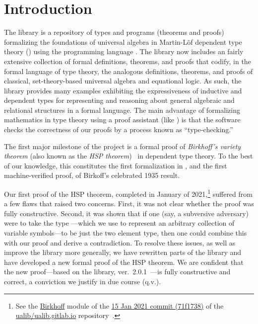 \section{Introduction}
The \agdaalgebras library \cite{ualib_v2.0.1} is a repository of types and programs
(theorems and proofs) formalizing the foundations of universal algebra in Martin-Löf
dependent type theory (\mltt) using the \agda programming language \cite{Norell:2007,agdaref}.
The library now includes an fairly extensive collection of formal definitions, theorems, and
proofs that codify, in the formal language of type theory, the analogous definitions,
theorems, and proofs of classical, set-theory-based universal algebra and equational
logic. As such, the \agdaalgebras library provides many examples exhibiting the
expressiveness of inductive and dependent types for representing and reasoning about
general algebraic and relational structures in a formal language.
\ifshort\else
The main advantage of
formalizing mathematics in type theory using a proof assistant (like \agda) is that
the software checks the correctness of our proofs by a process known as ``type-checking.''
\fi

The first major milestone of the \agdaalgebras project is a formal proof of \emph{Birkhoff's
variety theorem} (also known as the \emph{HSP theorem})~\cite{Birkhoff:1935} in dependent
type theory.
To the best of our knowledge, this constitutes the first formalization in \mltt, and the
first machine-verified proof, of Birkoff's celebrated 1935 result.

Our first proof of the HSP theorem, completed in January of
2021,\footnote{See the
 \href{https://github.com/ualib/ualib.github.io/blob/71f173858701398d56224dd79d152c380c0c2b5e/src/lagda/UALib/Birkhoff.lagda}{Birkhoff}
 module of the
 \href{https://github.com/ualib/ualib.github.io/commit/71f173858701398d56224dd79d152c380c0c2b5e}{15
 Jan 2021  commit (71f1738)} of the
 \href{https://github.com/ualib/ualib.github.io}{ualib/ualib.gitlab.io}
 repository~\cite{ualib_v1.0.0}.}
suffered from a few flaws that raised two concerns. First, it was not clear whether the
proof was fully constructive. Second, it was shown that if one (say, a subversive
adversary) were to take the type ---which we use to represent an arbitrary collection of
variable symbols---to be just the two element type, then one could combine this with our
proof and derive a contradiction. To resolve these issues, as well as improve the
\agdaalgebras library more generally, we have rewritten parts of the library and have
developed a new formal proof of the HSP theorem. We are confident that the new
proof---based on the \agdaalgebras library, ver.~2.0.1~\cite{ualib_v2.0.1}---is fully
constructive and correct, a conviction we justify in due course (q.v.).

